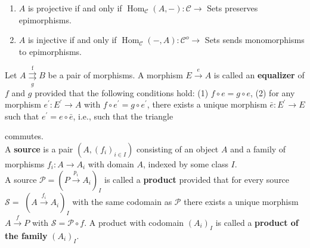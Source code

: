 \begin{prop}
\begin{enumerate}
    \item $A$ is projective if and only if $\operatorname{Hom}_\mathcal{C}(A,-): \mathcal{C} \rightarrow$ Sets preserves epimorphisms. 
    \item $A$ is injective if and only if $\operatorname{Hom}_\mathcal{C}(-, A): \mathcal{C}^o \rightarrow$ Sets sends monomorphisms to epimorphisms.
\end{enumerate}
\end{prop}




Let $A \stackrel{\text { f }}{\underset{g}{\rightrightarrows}} B$ be a pair of morphisms. A morphism $E \xrightarrow{e} A$ is called an \textbf{equalizer} of $f$ and $g$ provided that the following conditions hold:
(1) $f \circ e=g \circ e$,
(2) for any morphism $e^{\prime}: E^{\prime} \rightarrow A$ with $f \circ e^{\prime}=g \circ e^{\prime}$, there exists a unique morphism $\bar{e}: E^{\prime} \rightarrow E$ such that $e^{\prime}=e \circ \bar{e}$, i.e., such that the triangle
 commutes.\\

   

A \textbf{source} is a pair $\left(A,\left(f_i\right)_{i \in I}\right)$ consisting of an object $A$ and a family of morphisms $f_i: A \rightarrow A_i$ with domain $A$, indexed by some class $I$.\\
A source $\mathcal{P}=\left(P \xrightarrow{p_i} A_i\right)_I$ is called a \textbf{product} provided that for every source $\mathcal{S}=$ $\left(A \xrightarrow{f_i} A_i\right)_I$ with the same codomain as $\mathcal{P}$ there exists a unique morphism $A \xrightarrow{f} P$ with $\mathcal{S}=\mathcal{P} \circ f$. A product with codomain $\left(A_i\right)_I$ is called a \textbf{product of the family} $\left(A_i\right)_I$.\\

